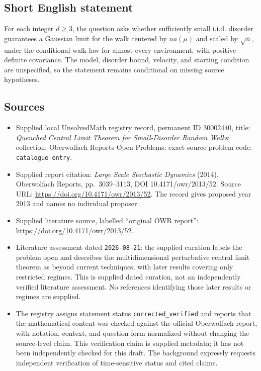 \documentclass[11pt]{article}
\begin{document}
\subsection{Short English statement}
For each integer \(d\geq 3\), the question asks whether sufficiently small i.i.d. disorder guarantees a Gaussian limit for the walk centered by \(na(\mu)\) and scaled by \(\sqrt n\), under the conditional walk law for almost every environment, with positive definite covariance. The model, disorder bound, velocity, and starting condition are unspecified, so the statement remains conditional on missing source hypotheses.
\subsection{Sources}
\begin{itemize}
\item Supplied local UnsolvedMath registry record, permanent ID \(30002440\), title: \emph{Quenched Central Limit Theorem for Small-Disorder Random Walks}; collection: Oberwolfach Reports Open Problems; exact source problem code: \texttt{catalogue entry}.
\item Supplied report citation: \emph{Large Scale Stochastic Dynamics} (2014), Oberwolfach Reports, pp.~3039--3113, DOI 10.4171/owr/2013/52. Source URL: \url{https://doi.org/10.4171/owr/2013/52}. The record gives proposed year 2013 and names no individual proposer.
\item Supplied literature source, labelled ``original OWR report'': \url{https://doi.org/10.4171/owr/2013/52}.
\item Literature assessment dated \texttt{2026-08-21}: the supplied curation labels the problem open and describes the multidimensional perturbative central limit theorem as beyond current techniques, with later results covering only restricted regimes. This is supplied dated curation, not an independently verified literature assessment. No references identifying those later results or regimes are supplied.
\item The registry assigns statement status \texttt{corrected\_verified} and reports that the mathematical content was checked against the official Oberwolfach report, with notation, context, and question form normalized without changing the source-level claim. This verification claim is supplied metadata; it has not been independently checked for this draft. The background expressly requests independent verification of time-sensitive status and cited claims.
\end{itemize}
\end{document}
